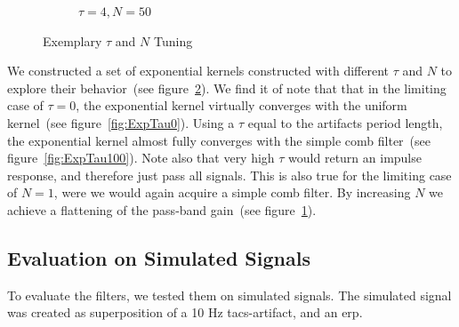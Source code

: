 \documentclass[a4paper]{article}
\newcommand{\figref}[1]{(see figure~\ref{#1})}
\begin{document}
\begin{figure}[hbtp]
\begin{subfigure}{.245\textwidth}
        \caption{$\tau= 4, N=50$}\label{fig:ExpNP50}
    \end{subfigure}
    \caption{Exemplary $\tau$ and $N$ Tuning}\label{fig:ExemplaryTuning}
\end{figure}

We constructed a set of exponential kernels constructed with different $\tau$ and $N$ to explore their behavior~\figref{fig:ExemplaryTuning}.
We find it of note that that in the limiting case of $\tau = 0$, the exponential kernel virtually converges with the uniform kernel~\figref{fig:ExpTau0}. Using a $\tau$ equal to the artifacts period length, the exponential kernel almost fully converges with the simple comb filter~\figref{fig:ExpTau100}.
Note also that very high $\tau$ would return an impulse response, and therefore just pass all signals.
This is also  true for the limiting case of $N = 1$, were we would again acquire a simple comb filter. By increasing $N$ we achieve a flattening of the pass-band gain~\figref{fig:ExpNP50}.

\subsection{Evaluation on Simulated Signals}\label{sec:EvaluationSimulated}

To evaluate the filters, we tested them on simulated signals. The simulated signal was created as superposition of a 10 Hz \gls{tacs}-artifact, and an \gls{erp}.
\end{document}
